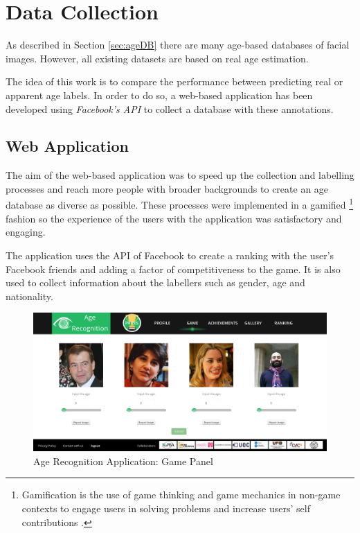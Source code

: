 \chapter{Data Collection} \label{chap:data}

As described in Section \ref{sec:ageDB} there are many age-based databases of facial images. However, all existing datasets are based on real age estimation. 

The idea of this work is to compare the performance between predicting real or apparent age labels. In order to do so, a web-based application has been developed using \textit{Facebook's API} to collect a database with these annotations.

\section{Web Application}

The aim of the web-based application was to speed up the collection and labelling processes and reach more people with broader backgrounds to create an age database as diverse as possible. These processes were implemented in a gamified \footnote{Gamification is the use of game thinking and game mechanics in non-game contexts to engage users in solving problems and increase users' self contributions \cite{Deterding:2011:GDE:2181037.2181040}.} fashion so the experience of the users with the application was satisfactory and engaging. 

The application uses the API of Facebook to create a ranking with the user's Facebook friends and adding a factor of competitiveness to the game. It is also used to collect information about the labellers such as gender, age and nationality.

\begin{figure}[!h]
	\centering
	\includegraphics[width=\textwidth]{figures/age_app_1}
	\caption{Age Recognition Application: Game Panel}
	\label{fig:game}
\end{figure}

